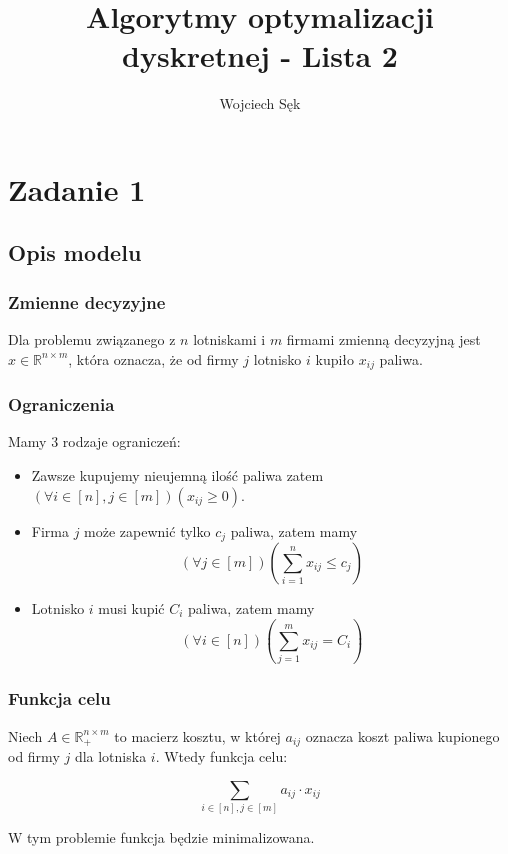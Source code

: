 \documentclass{article}
\title{Algorytmy optymalizacji dyskretnej - Lista 2}
\author{Wojciech Sęk}
\begin{document}
\maketitle
\section{Zadanie 1}
\subsection{Opis modelu}
\subsubsection{Zmienne decyzyjne}
Dla problemu związanego z $n$ lotniskami i $m$ firmami zmienną decyzyjną jest $x\in\mathbb{R}^{n \times m}$, która oznacza, że od firmy $j$ lotnisko $i$ kupiło $x_{ij}$ paliwa.
\subsubsection{Ograniczenia}
Mamy 3 rodzaje ograniczeń:
\begin{itemize}
\item Zawsze kupujemy nieujemną ilość paliwa zatem $(\forall i\in[n],j\in[m])(x_{ij} \geq 0)$.
\item Firma $j$ może zapewnić tylko $c_j$ paliwa, zatem mamy
$$\left(\forall j\in[m]\right)\left(\sum_{i=1}^n x_{ij} \leq c_j\right)$$
\item Lotnisko $i$ musi kupić $C_i$ paliwa, zatem mamy
$$\left(\forall i\in[n]\right)\left(\sum_{j=1}^m x_{ij} = C_i\right)$$
\end{itemize}
\subsubsection{Funkcja celu}
Niech $A\in\mathbb{R}_+^{n \times m}$ to macierz kosztu, w której $a_{ij}$ oznacza koszt paliwa kupionego od firmy $j$ dla lotniska $i$. Wtedy funkcja celu:

$$\sum_{i\in[n],j\in[m]} a_{ij} \cdot x_{ij}$$

W tym problemie funkcja będzie minimalizowana.
\end{document}
